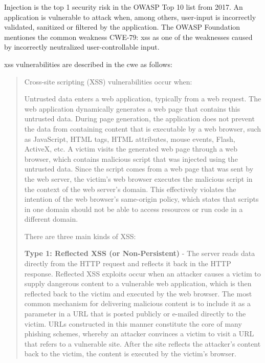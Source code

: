 
Injection is the top 1 security risk in the OWASP Top 10 list from 2017.
An application is vulnerable to attack when, among others, user-input is incorrectly validated, sanitized or filtered by the application.
The OWASP Foundation mentiones the common weakness CWE-79: \acrfull{xss} as one of the weaknesses caused by incorrectly neutralized user-controllable input. \cite{OWASP/Risks2017,OWASP/Injection}

\acrlong{xss} vulnerabilities are described in the \acrfull{cwe} as follows:
\begin{quote}
	Cross-site scripting (XSS) vulnerabilities occur when:

	Untrusted data enters a web application, typically from a web request.
	The web application dynamically generates a web page that contains this untrusted data.
	During page generation, the application does not prevent the data from containing content that is executable by a web browser, such as JavaScript, HTML tags, HTML attributes, mouse events, Flash, ActiveX, etc.
	A victim visits the generated web page through a web browser, which contains malicious script that was injected using the untrusted data.
	Since the script comes from a web page that was sent by the web server, the victim's web browser executes the malicious script in the context of the web server's domain.
	This effectively violates the intention of the web browser's same-origin policy, which states that scripts in one domain should not be able to access resources or run code in a different domain.

	There are three main kinds of XSS:

	\textbf{Type 1: Reflected XSS (or Non-Persistent)} - The server reads data directly from the HTTP request and reflects it back in the HTTP response. Reflected XSS exploits occur when an attacker causes a victim to supply dangerous content to a vulnerable web application, which is then reflected back to the victim and executed by the web browser. The most common mechanism for delivering malicious content is to include it as a parameter in a URL that is posted publicly or e-mailed directly to the victim. URLs constructed in this manner constitute the core of many phishing schemes, whereby an attacker convinces a victim to visit a URL that refers to a vulnerable site. After the site reflects the attacker's content back to the victim, the content is executed by the victim's browser.


\end{quote}
